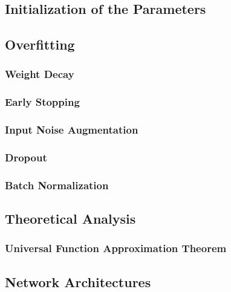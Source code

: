 		\subsection{Initialization of the Parameters} %

		\subsection{Overfitting} %

			\subsubsection{Weight Decay} %

			\subsubsection{Early Stopping} %

			\subsubsection{Input Noise Augmentation} %

			\subsubsection{Dropout} %

			\subsubsection{Batch Normalization} %

		\subsection{Theoretical Analysis} %

			\subsubsection{Universal Function Approximation Theorem} %

		\subsection{Network Architectures} %

